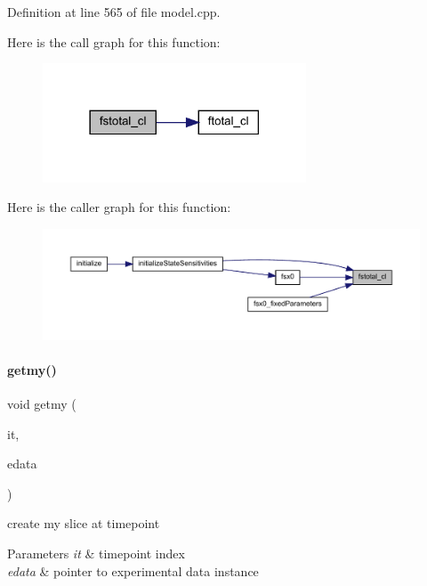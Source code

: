 Definition at line 565 of file model.\+cpp.

Here is the call graph for this function\+:
\nopagebreak
\begin{figure}[H]
\begin{center}
\leavevmode
\includegraphics[width=222pt]{classamici_1_1_model_a6fe0e8c26a7c1f72e3afd0f1322b3416_cgraph}
\end{center}
\end{figure}
Here is the caller graph for this function\+:
\nopagebreak
\begin{figure}[H]
\begin{center}
\leavevmode
\includegraphics[width=350pt]{classamici_1_1_model_a6fe0e8c26a7c1f72e3afd0f1322b3416_icgraph}
\end{center}
\end{figure}
\mbox{\label{classamici_1_1_model_aa01d5361cf972cce5eaddca05985f745}} 
\paragraph{\texorpdfstring{getmy()}{getmy()}}
{\footnotesize\ttfamily void getmy (\begin{DoxyParamCaption}\item[{const int}]{it,  }\item[{const \mbox{\hyperlink{classamici_1_1_exp_data}{Exp\+Data}} $\ast$}]{edata }\end{DoxyParamCaption})\hspace{0.3cm}{\ttfamily [protected]}}

create my slice at timepoint 
\begin{DoxyParams}{Parameters}
{\em it} & timepoint index \\
\hline
{\em edata} & pointer to experimental data instance \\
\hline
\end{DoxyParams}


